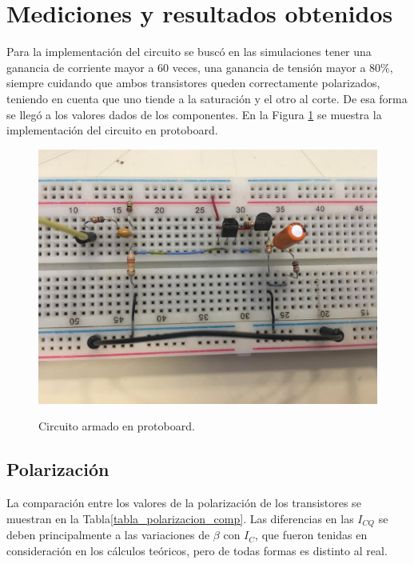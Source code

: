 \section{Mediciones y resultados obtenidos}

Para la implementación del circuito se buscó en las simulaciones tener una ganancia de corriente mayor a 60 veces, una ganancia de tensión mayor a 80\%, siempre cuidando que ambos transistores queden correctamente polarizados, teniendo en cuenta que uno tiende a la saturación y el otro al corte. De esa forma se llegó a los valores dados de los componentes. En la Figura \ref{circ_proto} se muestra la implementación del circuito en protoboard.

		\begin{figure}[H]
			\centering
			\resizebox{0.7\textwidth}{!} {%
				\includegraphics[angle=90]{./Imagenes/circuito_proto.jpeg} 
			}
			\caption{Circuito armado en protoboard.}
			\label{circ_proto}
		\end{figure}

\subsection{Polarización}
La comparación entre los valores de la polarización de los transistores se muestran en la Tabla\ref{tabla_polarizacion_comp}. Las diferencias en las $I_{CQ}$ se deben principalmente a las variaciones de $\beta$ con $I_{C}$, que fueron tenidas en consideración en los cálculos teóricos, pero de todas formas es distinto al real.


